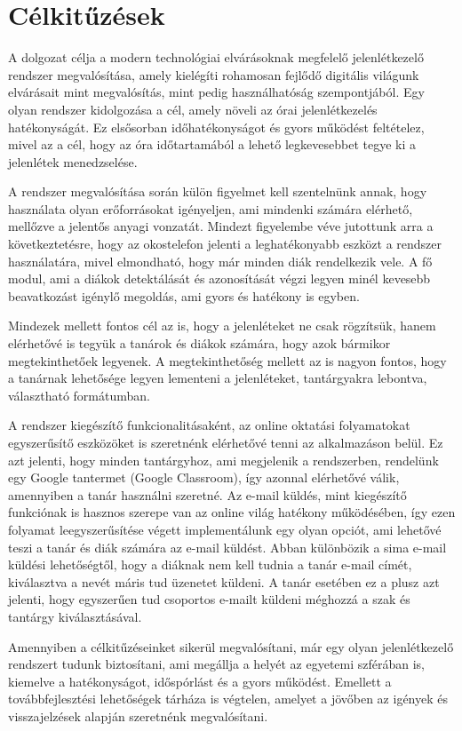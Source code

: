 \chapter{Célkitűzések} \label{chapter2}

A dolgozat célja a modern technológiai elvárásoknak megfelelő jelenlétkezelő rendszer megvalósítása, amely kielégíti rohamosan fejlődő digitális világunk elvárásait mint megvalósítás, mint pedig használhatóság szempontjából. 
Egy olyan rendszer kidolgozása a cél, amely növeli az órai jelenlétkezelés hatékonyságát. Ez elsősorban időhatékonyságot és gyors működést feltételez, mivel az a cél, hogy az óra időtartamából a lehető legkevesebbet tegye ki a jelenlétek menedzselése.

A rendszer megvalósítása során külön figyelmet kell szentelnünk annak, hogy használata olyan erőforrásokat igényeljen, ami mindenki számára elérhető, mellőzve a jelentős anyagi vonzatát. Mindezt figyelembe véve jutottunk arra a következtetésre, hogy az okostelefon jelenti a leghatékonyabb eszközt a rendszer használatára, mivel elmondható, hogy már minden diák rendelkezik vele. A fő modul, ami a diákok detektálását és azonosítását végzi legyen minél kevesebb beavatkozást igénylő megoldás, ami gyors és hatékony is egyben.

Mindezek mellett fontos cél az is, hogy a jelenléteket ne csak rögzítsük, hanem elérhetővé is tegyük a tanárok és diákok számára, hogy azok bármikor megtekinthetőek legyenek. A megtekinthetőség mellett az is nagyon fontos, hogy a tanárnak lehetősége legyen lementeni a jelenléteket, tantárgyakra lebontva, választható formátumban.

A rendszer kiegészítő funkcionalitásaként, az online oktatási folyamatokat egyszerűsítő eszközöket is szeretnénk elérhetővé tenni az alkalmazáson belül. Ez azt jelenti, hogy minden tantárgyhoz, ami megjelenik a rendszerben, rendelünk egy Google tantermet (Google Classroom), így azonnal elérhetővé válik, amennyiben a tanár használni szeretné. Az e-mail küldés, mint kiegészítő funkciónak is hasznos szerepe van az online világ hatékony működésében, így ezen folyamat leegyszerűsítése végett implementálunk egy olyan opciót, ami lehetővé teszi a tanár és diák számára az e-mail küldést. Abban különbözik a sima e-mail küldési lehetőségtől, hogy a diáknak nem kell tudnia a tanár e-mail címét, kiválasztva a nevét máris tud üzenetet küldeni. A tanár esetében ez a plusz azt jelenti, hogy egyszerűen tud csoportos e-mailt küldeni méghozzá a szak és tantárgy kiválasztásával.

Amennyiben a célkitűzéseinket sikerül megvalósítani, már egy olyan jelenlétkezelő rendszert tudunk biztosítani, ami megállja a helyét az egyetemi szférában is, kiemelve a hatékonyságot, időspórlást és a gyors működést. Emellett a továbbfejlesztési lehetőségek tárháza is végtelen, amelyet a jövőben az igények és visszajelzések alapján szeretnénk megvalósítani.



